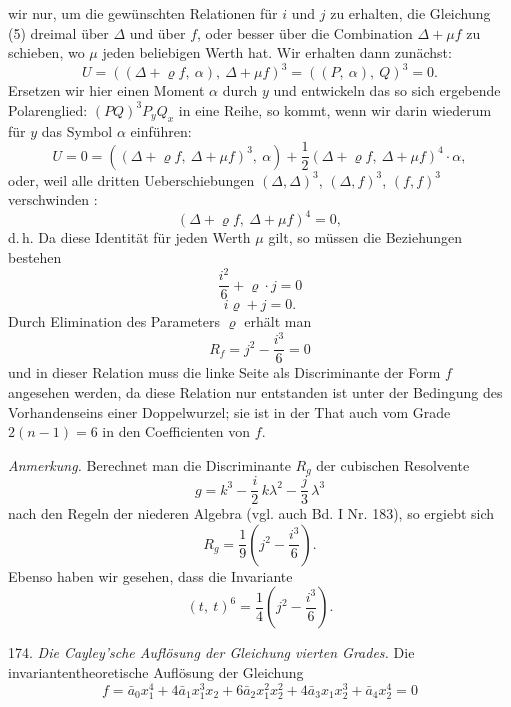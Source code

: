 wir nur, um die gewünschten Relationen für $i$ und $j$ zu erhalten,
die Gleichung (5) dreimal über $\varDelta$ und über $f$, oder besser über die Combination
 $\varDelta+\mu f$ zu schieben, wo $\mu$ jeden beliebigen Werth hat. Wir
erhalten dann zunächst:
\[
U = ((\varDelta+\varrho f,\ \alpha),\ \varDelta+\mu f)^3 = ((P,\ \alpha),\ Q)^3 = 0.
\]
Ersetzen wir hier einen Moment $\alpha$ durch $y$ und entwickeln das so
sich ergebende Polarenglied: $(PQ)^3 P_y Q_x$ in eine Reihe, so kommt,
wenn wir darin wiederum für $y$ das Symbol $\alpha$ einführen:
\[
U = 0 = ((\varDelta+\varrho f,\ \varDelta+\mu f)^3,\ \alpha) + \frac{1}{2}(\varDelta+\varrho f,\ \varDelta+\mu f)^4\cdot\alpha,
\]
oder, weil alle dritten Ueberschiebungen $(\varDelta,\varDelta)^3$, $(\varDelta,f)^3$, $(f,f)^3$ verschwinden
:
\[
(\varDelta+\varrho f,\ \varDelta+\mu f)^4 = 0,
\]
d.\,h.
Da diese Identität für jeden Werth $\mu$ gilt, so müssen die Beziehungen
bestehen
\[
\frac{i^2}{6} + \varrho\cdot j = 0
\]
\[
i\varrho + j = 0.
\]
Durch Elimination des Parameters $\varrho$ erhält man
\[
R_f = j^2 - \frac{i^3}{6} = 0
\]
und in dieser Relation muss die linke Seite als Discriminante der
Form $f$ angesehen werden, da diese Relation nur entstanden ist unter
der Bedingung des Vorhandenseins einer Doppelwurzel; sie ist in der
That auch vom Grade $2(n-1)=6$ in den Coefficienten von $f$.

\textit{Anmerkung.} Berechnet man die Discriminante $R_g$ der cubischen
Resolvente
\[
g = k^3 - \frac{i}{2}\,k\lambda^2 - \frac{j}{3}\,\lambda^3
\]
nach den Regeln der niederen Algebra (vgl. auch Bd. I Nr. 183), so
ergiebt sich
\[
R_g = \frac{1}{9}\left(j^2 - \frac{i^3}{6}\right).
\]
Ebenso haben wir gesehen, dass die Invariante
\[
(t,\ t)^6 = \frac{1}{4}\left(j^2 - \frac{i^3}{6}\right).
\]

174. \textit{Die Cayley'sche Auflösung der Gleichung vierten Grades.} Die
invariantentheoretische Auflösung der Gleichung
\[
f = \bar a_0 x_1^4 + 4\bar a_1 x_1^3 x_2 + 6\bar a_2 x_1^2 x_2^2 + 4\bar a_3 x_1 x_2^3 + \bar a_4 x_2^4 = 0
\]



